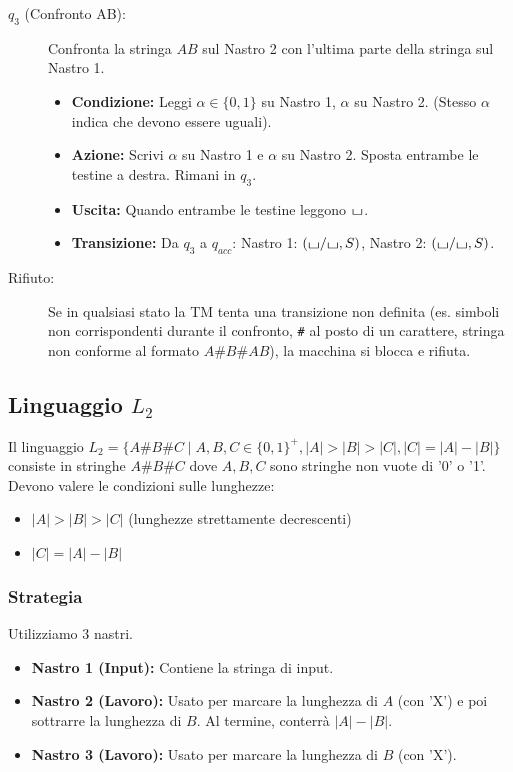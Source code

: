 \documentclass[a4paper]{article}
\theoremstyle{definition} %
\newcommand{\blankS}{\ensuremath{\raisebox{-0.15ex}{\scalebox{1.3}[0.7]{$\sqcup$}}}}
\begin{document}
\begin{description}
\begin{itemize}
    \end{itemize}
    \item[$q_3$ (Confronto AB):] Confronta la stringa $AB$ sul Nastro 2 con l'ultima parte della stringa sul Nastro 1.
    \begin{itemize}
        \item \textbf{Condizione:} Leggi $\alpha \in \{0,1\}$ su Nastro 1, $\alpha$ su Nastro 2. (Stesso $\alpha$ indica che devono essere uguali).
        \item \textbf{Azione:} Scrivi $\alpha$ su Nastro 1 e $\alpha$ su Nastro 2. Sposta entrambe le testine a destra. Rimani in $q_3$.
        \item \textbf{Uscita:} Quando entrambe le testine leggono $\blankS$.
        \item \textbf{Transizione:} Da $q_3$ a $q_{acc}$: Nastro 1: $(\blankS/\blankS, S)$, Nastro 2: $(\blankS/\blankS, S)$.
    \end{itemize}
    \item[Rifiuto:] Se in qualsiasi stato la TM tenta una transizione non definita (es. simboli non corrispondenti durante il confronto, \texttt{\#} al posto di un carattere, stringa non conforme al formato $A\texttt{\#}B\texttt{\#}AB$), la macchina si blocca e rifiuta.
\end{description}

\subsection{Linguaggio $L_2$}
Il linguaggio $L_2 = \{A\#B\#C \mid A,B,C \in \{0,1\}^+, |A|>|B|>|C|, |C|=|A|-|B|\}$ consiste in stringhe $A\#B\#C$ dove $A,B,C$ sono stringhe non vuote di '0' o '1'. Devono valere le condizioni sulle lunghezze:
\begin{itemize}
    \item $|A| > |B| > |C|$ (lunghezze strettamente decrescenti)
    \item $|C| = |A| - |B|$
\end{itemize}

\subsubsection{Strategia}
Utilizziamo 3 nastri.
\begin{itemize}
    \item \textbf{Nastro 1 (Input):} Contiene la stringa di input.
    \item \textbf{Nastro 2 (Lavoro):} Usato per marcare la lunghezza di $A$ (con 'X') e poi sottrarre la lunghezza di $B$. Al termine, conterrà $|A|-|B|$.
    \item \textbf{Nastro 3 (Lavoro):} Usato per marcare la lunghezza di $B$ (con 'X').
\end{itemize}
\end{document}
